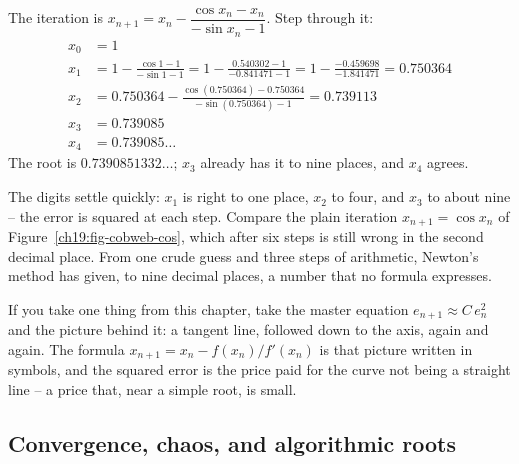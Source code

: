 \begin{labbox}
The iteration is $x_{n+1} = x_n - \dfrac{\cos x_n - x_n}{-\sin x_n - 1}$. Step
through it:
\begin{align*}
  x_0 &= 1 \\
  x_1 &= 1 - \frac{\cos 1 - 1}{-\sin 1 - 1}
       = 1 - \frac{0.540302 - 1}{-0.841471 - 1}
       = 1 - \frac{-0.459698}{-1.841471}
       = 0.750364 \\
  x_2 &= 0.750364 - \frac{\cos(0.750364) - 0.750364}{-\sin(0.750364) - 1}
       = 0.739113 \\
  x_3 &= 0.739085 \\
  x_4 &= 0.739085\ldots
\end{align*}
The root is $0.7390851332\ldots$; $x_3$ already has it to nine places, and $x_4$
agrees.
\end{labbox}

The digits settle quickly: $x_1$ is right to one place, $x_2$ to four, and $x_3$
to about nine -- the error is squared at each step. Compare the plain iteration $x_{n+1} = \cos x_n$ of
Figure~\ref{ch19:fig-cobweb-cos}, which after six steps is still wrong in the
second decimal place. From one crude guess and three steps of arithmetic, Newton's
method has given, to nine decimal places, a number that no formula expresses.

\begin{recoverybox}
If you take one thing from this chapter, take the master equation $e_{n+1} \approx
C\, e_n^2$ and the picture behind it: a tangent line, followed down to the axis,
again and again. The formula $x_{n+1} = x_n - f(x_n)/f'(x_n)$ is that picture
written in symbols, and the squared error is the price paid for the curve not
being a straight line -- a price that, near a simple root, is small.
\end{recoverybox}

\subsection{Convergence, chaos, and algorithmic roots}
\label{ch19:what-unlocked}

